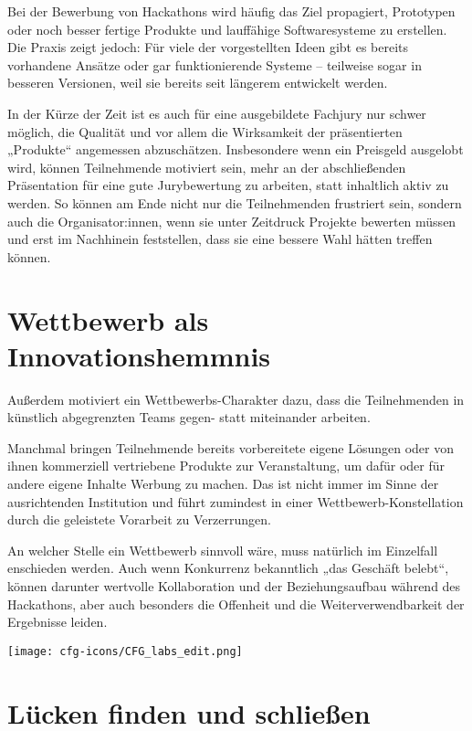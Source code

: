 Bei der Bewerbung von Hackathons wird häufig das Ziel propagiert, Prototypen oder noch besser fertige Produkte und lauffähige Softwaresysteme zu erstellen. Die Praxis zeigt jedoch: Für viele der vorgestellten Ideen gibt es bereits vorhandene Ansätze oder gar funktionierende Systeme – teilweise sogar in besseren Versionen, weil sie bereits seit längerem entwickelt werden.

In der Kürze der Zeit ist es auch für eine ausgebildete Fachjury nur schwer möglich, die Qualität und vor allem die Wirksamkeit der präsentierten „Produkte“ angemessen abzuschätzen. Insbesondere wenn ein Preisgeld ausgelobt wird, können Teilnehmende motiviert sein, mehr an der abschließenden Präsentation für eine gute Jurybewertung zu arbeiten, statt inhaltlich aktiv zu werden. So können am Ende nicht nur die Teilnehmenden frustriert sein, sondern auch die Organisator:innen, wenn sie unter Zeitdruck Projekte bewerten müssen und erst im Nachhinein feststellen, dass sie eine bessere Wahl hätten treffen können.

\section*{Wettbewerb als Innovationshemmnis}

Außerdem motiviert ein Wettbewerbs-Charakter dazu, dass die Teilnehmenden in künstlich abgegrenzten Teams gegen- statt miteinander arbeiten.

Manchmal bringen Teilnehmende bereits vorbereitete eigene Lösungen oder von ihnen kommerziell vertriebene Produkte zur Veranstaltung, um dafür oder für andere eigene Inhalte Werbung zu machen. Das ist nicht immer im Sinne der ausrichtenden Institution und führt zumindest in einer Wettbewerb-Konstellation durch die geleistete Vorarbeit zu Verzerrungen.

An welcher Stelle ein Wettbewerb sinnvoll wäre, muss natürlich im Einzelfall enschieden werden. Auch wenn Konkurrenz bekanntlich „das Geschäft belebt“, können darunter wertvolle Kollaboration und der Beziehungsaufbau während des Hackathons, aber auch besonders die Offenheit und die Weiterverwendbarkeit der Ergebnisse leiden.


\begin{marginfigure}[-16.5cm]
	\texttt{[image: cfg-icons/CFG\_labs\_edit.png]}
\end{marginfigure}


\section*{Lücken finden und schließen}

